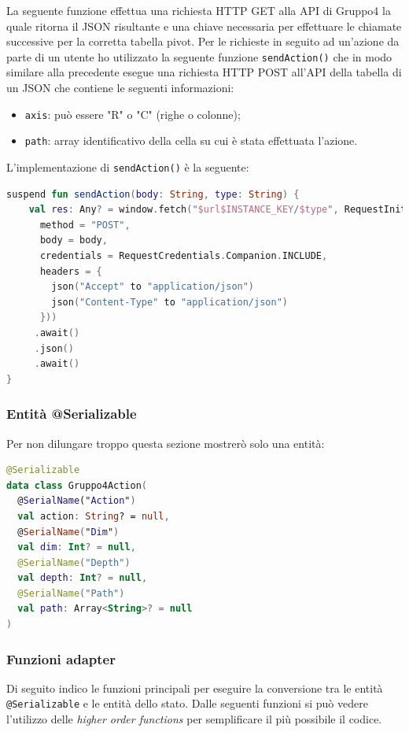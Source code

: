 \noindent
La seguente funzione effettua una richiesta HTTP GET alla API di Gruppo4 la quale ritorna il JSON risultante e una chiave necessaria per effettuare le chiamate successive per la corretta tabella pivot. Per le richieste in seguito ad un'azione da parte di un utente ho utilizzato la seguente funzione \verb|sendAction()| che in modo similare alla precedente esegue una richiesta HTTP POST all'API della tabella di un JSON che contiene le seguenti informazioni:
\begin{itemize}
	\item \verb|axis|: può essere "R" o "C" (righe o colonne);
	\item \verb|path|: array identificativo della cella su cui è stata effettuata l'azione.
\end{itemize}
L'implementazione di \verb|sendAction()| è la seguente: 
\begin{lstlisting}[caption={Funzione sendAction()}, label={lst:bodycells}, language=Kotlin]
suspend fun sendAction(body: String, type: String) {
    val res: Any? = window.fetch("$url$INSTANCE_KEY/$type", RequestInit(
      method = "POST",
      body = body,
      credentials = RequestCredentials.Companion.INCLUDE,
      headers = {
        json("Accept" to "application/json")
        json("Content-Type" to "application/json")
      }))
     .await()
     .json()
     .await()
}
\end{lstlisting}

\subsubsection{Entità @Serializable}
Per non dilungare troppo questa sezione mostrerò solo una entità:
\begin{lstlisting}[caption={data class Gruppo4Action}, label={lst:bodycells}, language=Kotlin]
@Serializable
data class Gruppo4Action(
  @SerialName("Action")
  val action: String? = null,
  @SerialName("Dim")
  val dim: Int? = null,
  @SerialName("Depth")
  val depth: Int? = null,
  @SerialName("Path")
  val path: Array<String>? = null
)
\end{lstlisting}
\subsubsection{Funzioni adapter}
Di seguito indico le funzioni principali per eseguire la conversione tra le entità \verb|@Serializable| e le entità dello stato. Dalle seguenti funzioni si può vedere l'utilizzo delle \emph{higher order functions} per semplificare il più possibile il codice.

